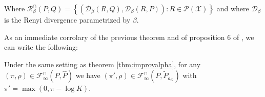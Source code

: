 \documentclass[twoside]{article}
\begin{document}
Where $\mathcal{R}_{\beta}^{\cap}\left(P,Q\right)=\left\{ \left(\mathcal{D}_{\beta}(R,Q),\mathcal{D}_{\beta}(R,P)\right):R\in\mathcal{P}(\mathcal{X})\right\} $
and where $\mathcal{D}_{\beta}$ is the Renyi divergence parametrized
by $\beta$.

As an immediate corrolary of the previous theorem and of proposition
6 of \cite{djolonga_precision-recall_2020}, we can write the following:

\begin{corollary}

Under the same setting as theorem \ref{thm:improvalpha}, for any $(\pi,\rho)\in\mathcal{F}_{\infty}^{\cap}\left(P,\widehat{P}\right)$
we have $(\pi',\rho)\in\mathcal{F}_{\infty}^{\cap}\left(P,\widetilde{P}_{a_{O}}\right)$
with $\pi'=\max\left(0,\pi-\log K\right)$. 

\end{corollary}
\end{document}
